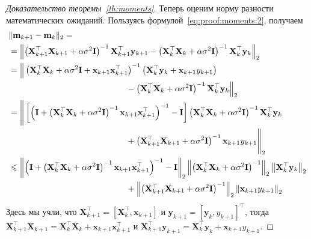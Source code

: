 \begin{proof}[Доказательство теоремы~\ref{th:moments}]
    Теперь оценим норму разности математических ожиданий. Пользуясь формулой~\eqref{eq:proof:moments:2}, получаем
    \begin{align}
        &\| \mathbf{m}_{k+1} - \mathbf{m}_k \|_2 = \notag \\
        &= \left\| \left( \mathbf{X}_{k+1}^\top \mathbf{X}_{k+1} + \alpha \sigma^2 \mathbf{I} \right)^{-1} \mathbf{X}_{k+1}^\top \mathbf{y}_{k+1} - \left( \mathbf{X}_k^\top \mathbf{X}_k + \alpha \sigma^2 \mathbf{I} \right)^{-1} \mathbf{X}_k^\top \mathbf{y}_k \right\|_2 \notag \\
        &= \Big\| \left( \mathbf{X}_k^\top \mathbf{X}_k + \alpha \sigma^2 \mathbf{I} + \mathbf{x}_{k+1} \mathbf{x}_{k+1}^\top \right)^{-1} \left( \mathbf{X}_k^\top \mathbf{y}_k + \mathbf{x}_{k+1} y_{k+1} \right) \notag \\
        &\qquad\qquad\qquad\qquad\qquad\qquad\qquad - \left( \mathbf{X}_k^\top \mathbf{X}_k + \alpha \sigma^2 \mathbf{I} \right)^{-1} \mathbf{X}_k^\top \mathbf{y}_k \Big\|_2 \notag \\
        &= \Bigg\| \left[ \left( \mathbf{I} + \left( \mathbf{X}_k^\top \mathbf{X}_k + \alpha \sigma^2 \mathbf{I} \right)^{-1} \mathbf{x}_{k+1} \mathbf{x}_{k+1}^\top \right)^{-1} - \mathbf{I} \right] \left( \mathbf{X}_k^\top \mathbf{X}_k + \alpha \sigma^2 \mathbf{I} \right)^{-1} \mathbf{X}_k^\top \mathbf{y}_k \notag \\
        &\qquad\qquad\qquad\qquad\qquad\qquad\qquad + \left( \mathbf{X}_{k+1}^\top \mathbf{X}_{k+1} + \alpha \sigma^2 \mathbf{I} \right)^{-1} \mathbf{x}_{k+1} y_{k+1} \Bigg\|_2 \label{eq:proof:moments:7} \\
        &\leqslant \left\| \left( \mathbf{I} + \left( \mathbf{X}_k^\top \mathbf{X}_k + \alpha \sigma^2 \mathbf{I} \right)^{-1} \mathbf{x}_{k+1} \mathbf{x}_{k+1}^\top \right)^{-1} - \mathbf{I} \right\|_2 \left\| \left( \mathbf{X}_k^\top \mathbf{X}_k + \alpha \sigma^2 \mathbf{I} \right)^{-1} \right\|_2 \left\| \mathbf{X}_k^\top \mathbf{y}_k \right\|_2 \notag \\
        &\qquad\qquad\qquad\qquad\qquad\qquad\qquad + \left\| \left( \mathbf{X}_{k+1}^\top \mathbf{X}_{k+1} + \alpha \sigma^2 \mathbf{I} \right)^{-1} \right\|_2 \left\| \mathbf{x}_{k+1} y_{k+1} \right\|_2 \label{eq:proof:moments:8}
    \end{align}
    Здесь мы учли, что $\mathbf{X}_{k+1}^\top = [\mathbf{X}_k^\top, \mathbf{x}_{k+1}]$ и $\mathbf{y}_{k+1} = [\mathbf{y}_k, y_{k+1}]^\top$, тогда $\mathbf{X}_{k+1}^\top \mathbf{X}_{k+1} = \mathbf{X}_k^\top \mathbf{X}_k + \mathbf{x}_{k+1} \mathbf{x}_{k+1}^\top$ и $\mathbf{X}_{k+1}^\top \mathbf{y}_{k+1} = \mathbf{X}_k^\top \mathbf{y}_k + \mathbf{x}_{k+1} y_{k+1}$.

\end{proof}
